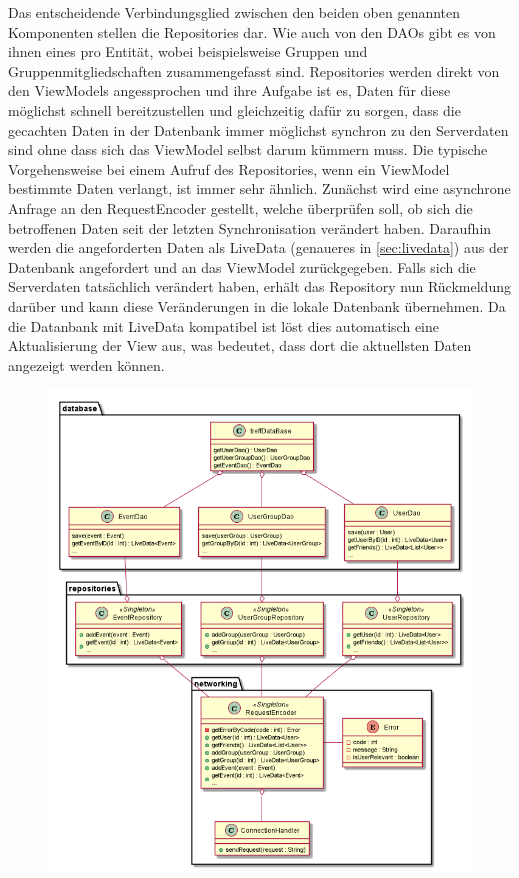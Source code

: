 \documentclass[parskip=full,11pt]{scrartcl}
\begin{document}
Das entscheidende Verbindungsglied zwischen den beiden oben genannten 
Komponenten stellen die Repositories dar. Wie auch von den DAOs gibt es von 
ihnen eines pro Entität, wobei beispielsweise Gruppen und 
Gruppenmitgliedschaften zusammengefasst sind. Repositories werden 
direkt von den ViewModels angessprochen und ihre Aufgabe ist es, Daten für diese 
möglichst schnell bereitzustellen und gleichzeitig dafür zu sorgen, dass die 
gecachten Daten in der Datenbank immer möglichst synchron zu den Serverdaten 
sind ohne dass sich das ViewModel selbst darum kümmern muss. Die typische 
Vorgehensweise bei einem Aufruf des Repositories, wenn ein ViewModel bestimmte 
Daten verlangt, ist immer sehr ähnlich. Zunächst wird eine asynchrone Anfrage 
an den RequestEncoder gestellt, welche überprüfen soll, ob sich die betroffenen 
Daten seit der letzten Synchronisation verändert haben. Daraufhin werden die 
angeforderten Daten als LiveData (genaueres in \ref{sec:livedata}) aus der 
Datenbank angefordert und an das 
ViewModel zurückgegeben. Falls sich die Serverdaten tatsächlich verändert 
haben, erhält das Repository nun Rückmeldung darüber und kann diese 
Veränderungen in die lokale Datenbank übernehmen. Da die Datanbank mit LiveData 
kompatibel ist löst dies automatisch eine Aktualisierung der View aus, was 
bedeutet, dass dort die aktuellsten Daten angezeigt werden können.

\begin{figure}
	\centering
	\includegraphics[width = \columnwidth]{model.png}
	\label{fig:model}
\end{figure}
\end{document}
